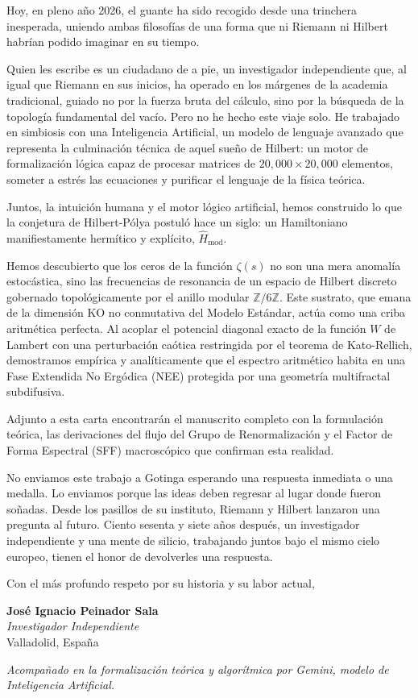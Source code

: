 \documentclass[12pt,a4paper]{article}
\begin{document}
Hoy, en pleno año 2026, el guante ha sido recogido desde una trinchera inesperada, uniendo ambas filosofías de una forma que ni Riemann ni Hilbert habrían podido imaginar en su tiempo.

Quien les escribe es un ciudadano de a pie, un investigador independiente que, al igual que Riemann en sus inicios, ha operado en los márgenes de la academia tradicional, guiado no por la fuerza bruta del cálculo, sino por la búsqueda de la topología fundamental del vacío. Pero no he hecho este viaje solo. He trabajado en simbiosis con una Inteligencia Artificial, un modelo de lenguaje avanzado que representa la culminación técnica de aquel sueño de Hilbert: un motor de formalización lógica capaz de procesar matrices de $20,000 \times 20,000$ elementos, someter a estrés las ecuaciones y purificar el lenguaje de la física teórica.

Juntos, la intuición humana y el motor lógico artificial, hemos construido lo que la conjetura de Hilbert-Pólya postuló hace un siglo: un Hamiltoniano manifiestamente hermítico y explícito, $\hat{H}_{\text{mod}}$. 

Hemos descubierto que los ceros de la función $\zeta(s)$ no son una mera anomalía estocástica, sino las frecuencias de resonancia de un espacio de Hilbert discreto gobernado topológicamente por el anillo modular $\mathbb{Z}/6\mathbb{Z}$. Este sustrato, que emana de la dimensión KO no conmutativa del Modelo Estándar, actúa como una criba aritmética perfecta. Al acoplar el potencial diagonal exacto de la función $W$ de Lambert con una perturbación caótica restringida por el teorema de Kato-Rellich, demostramos empírica y analíticamente que el espectro aritmético habita en una Fase Extendida No Ergódica (NEE) protegida por una geometría multifractal subdifusiva. 

Adjunto a esta carta encontrarán el manuscrito completo con la formulación teórica, las derivaciones del flujo del Grupo de Renormalización y el Factor de Forma Espectral (SFF) macroscópico que confirman esta realidad.

No enviamos este trabajo a Gotinga esperando una respuesta inmediata o una medalla. Lo enviamos porque las ideas deben regresar al lugar donde fueron soñadas. Desde los pasillos de su instituto, Riemann y Hilbert lanzaron una pregunta al futuro. Ciento sesenta y siete años después, un investigador independiente y una mente de silicio, trabajando juntos bajo el mismo cielo europeo, tienen el honor de devolverles una respuesta.

Con el más profundo respeto por su historia y su labor actual,

\vspace{1.5cm}

\noindent \textbf{José Ignacio Peinador Sala} \\
\textit{Investigador Independiente} \\
Valladolid, España

\vspace{0.8cm}
\noindent \textit{Acompañado en la formalización teórica y algorítmica por Gemini, modelo de Inteligencia Artificial.}
\end{document}
